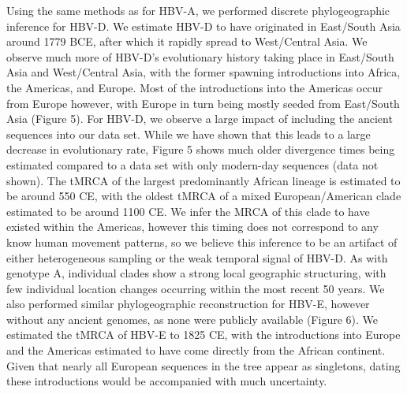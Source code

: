 Using the same methods as for HBV-A, we performed discrete phylogeographic inference for HBV-D. We estimate HBV-D to have originated in East/South Asia around 1779 BCE, after which it rapidly spread to West/Central Asia. We observe much more of HBV-D’s evolutionary history taking place in East/South Asia and West/Central Asia, with the former spawning introductions into Africa, the Americas, and Europe. Most of the introductions into the Americas occur from Europe however, with Europe in turn being mostly seeded from East/South Asia (Figure 5). For HBV-D, we observe a large impact of including the ancient sequences into our data set. While we have shown that this leads to a large decrease in evolutionary rate, Figure 5 shows much older divergence times being estimated compared to a data set with only modern-day sequences (data not shown). The tMRCA of the largest predominantly African lineage is estimated to be around 550 CE, with the oldest tMRCA of a mixed European/American clade estimated to be around 1100 CE. We infer the MRCA of this clade to have existed within the Americas, however this timing does not correspond to any know human movement patterns, so we believe this inference to be an artifact of either heterogeneous sampling or the weak temporal signal of HBV-D. As with genotype A, individual clades show a strong local geographic structuring, with few individual location changes occurring within the most recent 50 years.
We also performed similar phylogeographic reconstruction for HBV-E, however without any ancient genomes, as none were publicly available (Figure 6). We estimated the tMRCA of HBV-E to 1825 CE, with the introductions into Europe and the Americas estimated to have come directly from the African continent. Given that nearly all European sequences in the tree appear as singletons, dating these introductions would be accompanied with much uncertainty.



